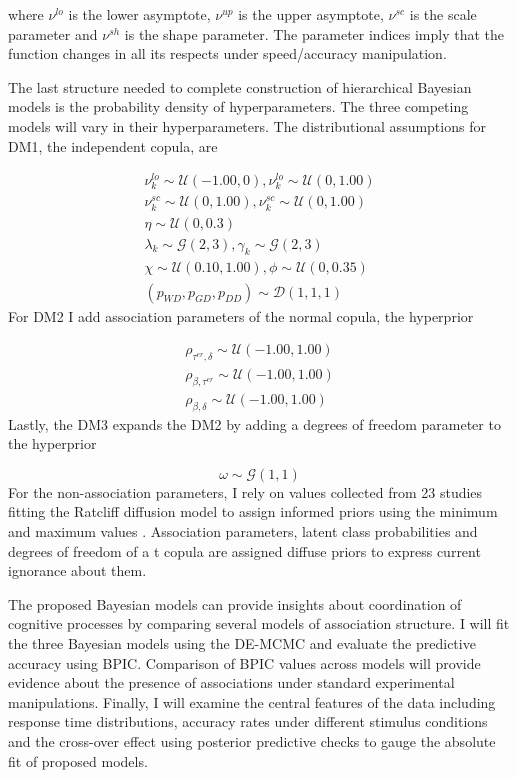 \documentclass[12pt]{article}
\begin{document}
\noindent where $\nu^{lo}$ is the lower asymptote, $\nu^{up}$ is the upper asymptote, $\nu^{sc}$ is the scale parameter and $\nu^{sh}$ is the shape parameter. The parameter indices imply that the function changes in all its respects under speed/accuracy manipulation.

	The last structure needed to complete construction of hierarchical Bayesian models is the probability density of hyperparameters. The three competing models will vary in their hyperparameters. The distributional assumptions for DM1, the independent copula, are
    
\begin{gather}
\nu_k^{lo} \sim \mathcal{U}(-1.00, 0), \nu_k^{lo} \sim \mathcal{U}(0, 1.00) \nonumber \\
\nu_k^{sc} \sim \mathcal{U}(0, 1.00), \nu_k^{sc} \sim \mathcal{U}(0, 1.00) \nonumber \\
\eta \sim \mathcal{U}(0, 0.3) \nonumber \\
\lambda_k \sim \mathcal{G}(2, 3), \gamma_k \sim \mathcal{G}(2, 3) \nonumber \\
\chi \sim \mathcal{U}(0.10, 1.00), \phi \sim \mathcal{U}(0, 0.35) \nonumber \\
(p_{WD}, p_{GD}, p_{DD}) \sim \mathcal{D}(1, 1, 1) 
\end{gather}
For DM2 I add association parameters of the normal copula, the hyperprior 

\begin{eqnarray}
\rho_{\tau^{er},\delta} \sim \mathcal{U}(-1.00, 1.00) \nonumber \\
\rho_{\beta,\tau^{er}} \sim \mathcal{U}(-1.00, 1.00) \nonumber \\
\rho_{\beta,\delta} \sim \mathcal{U}(-1.00, 1.00) 
\end{eqnarray}
Lastly, the DM3 expands the DM2 by adding a degrees of freedom parameter to the hyperprior

\begin{equation}
\omega \sim \mathcal{G}(1, 1)
\end{equation}
For the non-association parameters, I rely on values collected from 23 studies fitting the Ratcliff diffusion model to assign informed priors using the minimum and maximum values \citep{MatWag2009}. Association parameters, latent class probabilities and degrees of freedom of a t copula are assigned diffuse priors to express current ignorance about them.

	The proposed Bayesian models can provide insights about coordination of cognitive processes by comparing several models of association structure. I will fit the three Bayesian models using the DE-MCMC and evaluate the predictive accuracy using BPIC. Comparison of BPIC values across models will provide evidence about the presence of associations under standard experimental manipulations. Finally, I will examine the central features of the data including response time distributions, accuracy rates under different stimulus conditions and the cross-over effect using posterior predictive checks to gauge the absolute fit of proposed models.

\renewcommand{\bibsection}{\section{\bibname}}


\end{document}
